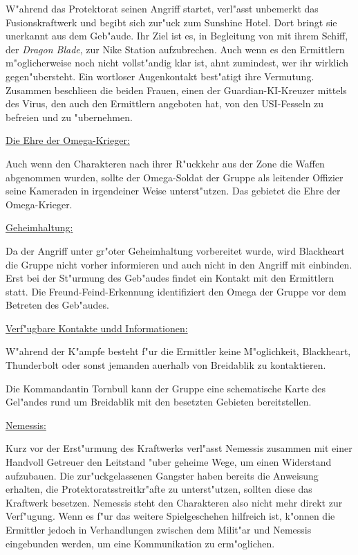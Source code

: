 W"ahrend das Protektorat seinen Angriff startet, verl"asst \xl{} unbemerkt das Fusionskraftwerk und begibt sich zur"uck zum Sunshine Hotel. Dort bringt sie \ml{} unerkannt aus dem Geb"aude. Ihr Ziel ist es, in Begleitung von \ml{} mit ihrem Schiff, der \emph{Dragon Blade}, zur Nike Station aufzubrechen. Auch wenn es den Ermittlern m"oglicherweise noch nicht vollst"andig klar ist, ahnt \ml{} zumindest, wer ihr wirklich gegen"ubersteht. Ein wortloser Augenkontakt best"atigt ihre Vermutung. Zusammen beschlie\3en die beiden Frauen, einen der Guardian-KI-Kreuzer mittels des Virus, den \ml{} auch den Ermittlern angeboten hat, von den USI-Fesseln zu befreien und zu "ubernehmen.

\begin{remarks}
	\underline{Die Ehre der Omega-Krieger:}

	Auch wenn den Charakteren nach ihrer R"uckkehr aus der Zone die Waffen abgenommen wurden, sollte der Omega-Soldat der Gruppe als leitender Offizier seine Kameraden in irgendeiner Weise unterst"utzen. Das gebietet die Ehre der Omega-Krieger.
	
	\underline{Geheimhaltung:}

	Da der Angriff unter gr"o\3ter Geheimhaltung vorbereitet wurde, wird Blackheart die Gruppe nicht vorher informieren und auch nicht in den Angriff mit einbinden. Erst bei der St"urmung des Geb"audes findet ein Kontakt mit den Ermittlern statt. Die Freund-Feind-Erkennung identifiziert den Omega der Gruppe vor dem Betreten des Geb"audes.

	\underline{Verf"ugbare Kontakte undd Informationen:}
	
	W"ahrend der K"ampfe besteht f"ur die Ermittler keine M"oglichkeit, Blackheart, Thunderbolt oder sonst jemanden au\3erhalb von Breidablik zu kontaktieren. 
	
	Die Kommandantin Tornbull kann der Gruppe eine schematische Karte des Gel"andes rund um Breidablik mit den besetzten Gebieten bereitstellen.

	\underline{Nemessis:}

	Kurz vor der Erst"urmung des Kraftwerks verl"asst Nemessis zusammen mit einer Handvoll Getreuer den Leitstand "uber geheime Wege, um einen Widerstand aufzubauen. Die zur"uckgelassenen Gangster haben bereits die Anweisung erhalten, die Protektoratsstreitkr"afte zu unterst"utzen, sollten diese das Kraftwerk besetzen. Nemessis steht den Charakteren also nicht mehr direkt zur Verf"ugung. Wenn es f"ur das weitere Spielgeschehen hilfreich ist, k"onnen die Ermittler jedoch in Verhandlungen zwischen dem Milit"ar und Nemessis eingebunden werden, um eine Kommunikation zu erm"oglichen.
\end{remarks}
